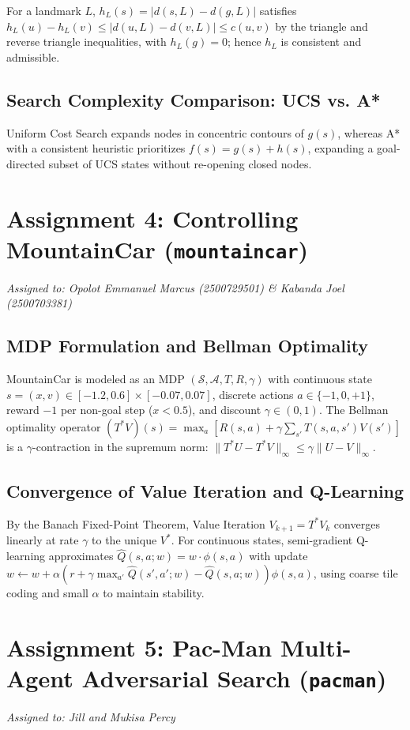 \documentclass[11pt,a4paper]{article}
\begin{document}
For a landmark $L$, $h_L(s) = |d(s, L) - d(g, L)|$ satisfies $h_L(u) - h_L(v) \le |d(u, L) - d(v, L)| \le c(u, v)$ by the triangle and reverse triangle inequalities, with $h_L(g) = 0$; hence $h_L$ is consistent and admissible.

\subsection{Search Complexity Comparison: UCS vs. A*}
Uniform Cost Search expands nodes in concentric contours of $g(s)$, whereas A* with a consistent heuristic prioritizes $f(s) = g(s) + h(s)$, expanding a goal-directed subset of UCS states without re-opening closed nodes.

\section{Assignment 4: Controlling MountainCar (\texttt{mountaincar})}
\textit{Assigned to: Opolot Emmanuel Marcus (2500729501) \& Kabanda Joel (2500703381)}

\subsection{MDP Formulation and Bellman Optimality}
MountainCar is modeled as an MDP $(\mathcal{S}, \mathcal{A}, T, R, \gamma)$ with continuous state $s = (x, v) \in [-1.2, 0.6] \times [-0.07, 0.07]$, discrete actions $a \in \{-1, 0, +1\}$, reward $-1$ per non-goal step ($x < 0.5$), and discount $\gamma \in (0, 1)$. The Bellman optimality operator $(T^* V)(s) = \max_{a} [R(s, a) + \gamma \sum_{s'} T(s, a, s') V(s')]$ is a $\gamma$-contraction in the supremum norm: $\|T^* U - T^* V\|_\infty \le \gamma \|U - V\|_\infty$.

\subsection{Convergence of Value Iteration and Q-Learning}
By the Banach Fixed-Point Theorem, Value Iteration $V_{k+1} = T^* V_k$ converges linearly at rate $\gamma$ to the unique $V^*$. For continuous states, semi-gradient Q-learning approximates $\hat{Q}(s, a; w) = w \cdot \phi(s, a)$ with update $w \leftarrow w + \alpha (r + \gamma \max_{a'} \hat{Q}(s', a'; w) - \hat{Q}(s, a; w))\phi(s, a)$, using coarse tile coding and small $\alpha$ to maintain stability.

\section{Assignment 5: Pac-Man Multi-Agent Adversarial Search (\texttt{pacman})}
\textit{Assigned to: Jill and Mukisa Percy}
\end{document}
